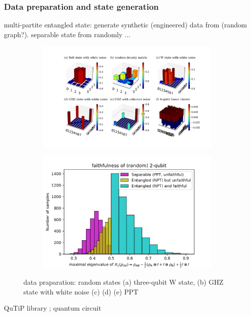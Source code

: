 \documentclass[
reprint,
aps,
pra,
floatfix,
]{revtex4-2}
\theoremstyle{plain}
\theoremstyle{definition}
\begin{document}
\subsubsection{Data preparation and state generation}
multi-partite entangled state: generate synthetic (engineered) data from (random graph?).
separable state from randomly ...

\begin{figure}[!ht]
	\centering
	\begin{subfigure}{0.45\textwidth}
	\centering
		\includegraphics[width=.9\linewidth]{./Code/dataset_sample_3x2.png}
	\end{subfigure}
	\begin{subfigure}{0.45\textwidth}
	\centering
		\includegraphics[width=.9\linewidth]{./Code/faithfulness_2_qubit.png}
	\end{subfigure}
	\caption{data praparation: random states (a) three-qubit W state, (b) GHZ state with white noise (c) (d) (e) PPT}
\end{figure}
QuTiP library \cite{johanssonQuTiPPythonFramework2013}; quantum circuit \cite{liPulselevelNoisyQuantum2022}
\end{document}
